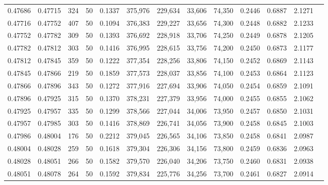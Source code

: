 \begin{tabular}{rrrrrrrrrrrrr}
0.47686 & 0.47715 &   324 &  50 &                                     0.1337 & 375,976 & 229,634 &  33,606 &  74,350 & 0.2446 & 0.6887 & 2.1271 \\
0.47716 & 0.47752 &   407 &  50 &                                     0.1094 & 376,383 & 229,227 &  33,656 &  74,300 & 0.2448 & 0.6882 & 2.1233 \\
0.47752 & 0.47782 &   309 &  50 &                                     0.1393 & 376,692 & 228,918 &  33,706 &  74,250 & 0.2449 & 0.6878 & 2.1205 \\
0.47782 & 0.47812 &   303 &  50 &                                     0.1416 & 376,995 & 228,615 &  33,756 &  74,200 & 0.2450 & 0.6873 & 2.1177 \\
0.47812 & 0.47845 &   359 &  50 &                                     0.1222 & 377,354 & 228,256 &  33,806 &  74,150 & 0.2452 & 0.6869 & 2.1143 \\
0.47845 & 0.47866 &   219 &  50 &                                     0.1859 & 377,573 & 228,037 &  33,856 &  74,100 & 0.2453 & 0.6864 & 2.1123 \\
0.47866 & 0.47896 &   343 &  50 &                                     0.1272 & 377,916 & 227,694 &  33,906 &  74,050 & 0.2454 & 0.6859 & 2.1091 \\
0.47896 & 0.47925 &   315 &  50 &                                     0.1370 & 378,231 & 227,379 &  33,956 &  74,000 & 0.2455 & 0.6855 & 2.1062 \\
0.47925 & 0.47957 &   335 &  50 &                                     0.1299 & 378,566 & 227,044 &  34,006 &  73,950 & 0.2457 & 0.6850 & 2.1031 \\
0.47957 & 0.47985 &   303 &  50 &                                     0.1416 & 378,869 & 226,741 &  34,056 &  73,900 & 0.2458 & 0.6845 & 2.1003 \\
0.47986 & 0.48004 &   176 &  50 &                                     0.2212 & 379,045 & 226,565 &  34,106 &  73,850 & 0.2458 & 0.6841 & 2.0987 \\
0.48004 & 0.48028 &   259 &  50 &                                     0.1618 & 379,304 & 226,306 &  34,156 &  73,800 & 0.2459 & 0.6836 & 2.0963 \\
0.48028 & 0.48051 &   266 &  50 &                                     0.1582 & 379,570 & 226,040 &  34,206 &  73,750 & 0.2460 & 0.6831 & 2.0938 \\
0.48051 & 0.48078 &   264 &  50 &                                     0.1592 & 379,834 & 225,776 &  34,256 &  73,700 & 0.2461 & 0.6827 & 2.0914 \\

\end{tabular}
